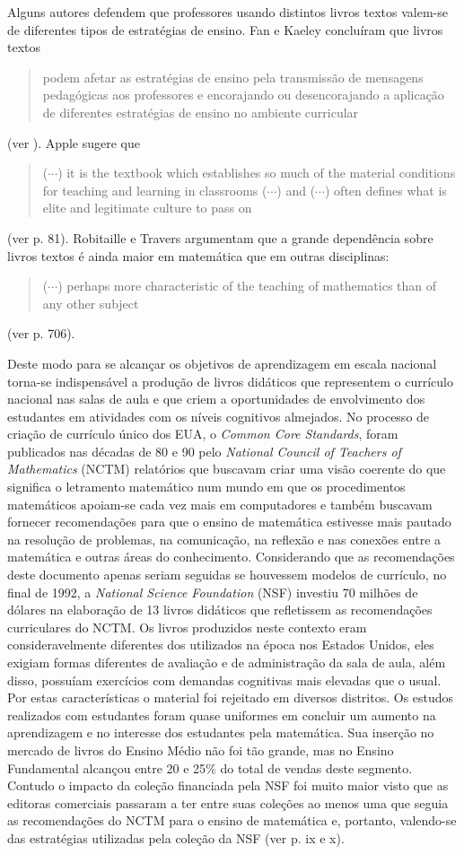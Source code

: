 \documentclass[10 pt]{article}
\begin{document}
Alguns autores defendem que professores usando distintos livros textos valem-se de diferentes tipos de estratégias de ensino. 
Fan e Kaeley concluíram que livros textos \blockquote{podem afetar as estratégias de ensino pela transmissão de mensagens pedagógicas aos professores e encorajando ou desencorajando a aplicação de diferentes estratégias de ensino no ambiente curricular} (ver \cite{fan2000influence}). Apple sugere que {\it 
\blockquote{($\cdots$) it is the textbook which establishes so much of the material conditions for teaching and learning in classrooms ($\cdots$) and ($\cdots$) often defines what is elite and legitimate culture to pass on}} (ver \cite{apple2013teachers} p. 81). Robitaille e Travers argumentam que a grande dependência sobre livros textos é ainda maior em matemática que em outras disciplinas:
{\it \blockquote{($\cdots$) perhaps more characteristic of the teaching of mathematics than of any other subject}} (ver \cite{robitaille1992international} p. 706).

Deste modo para se alcançar os objetivos de aprendizagem em escala nacional torna-se indispensável a produção de livros didáticos que representem o currículo nacional nas salas de aula e que criem a oportunidades de envolvimento dos estudantes em atividades com os níveis cognitivos almejados. 
No processo de criação de currículo único dos EUA, o {\it Common Core Standards}, foram publicados nas décadas de 80 e 90 pelo {\it National Council of Teachers of Mathematics} (NCTM) relatórios que buscavam criar uma visão coerente do que significa o letramento matemático num mundo em que os procedimentos matemáticos apoiam-se cada vez mais em computadores e também buscavam fornecer recomendações para que o ensino de matemática estivesse mais pautado na resolução de problemas, na comunicação, na reflexão e nas conexões entre a matemática e outras áreas do conhecimento.
Considerando que as recomendações deste documento apenas seriam seguidas se houvessem modelos de currículo,  no final de 1992, a {\it National Science Foundation} (NSF) investiu 70 milhões de dólares na elaboração de 13 livros didáticos que refletissem as recomendações curriculares do NCTM. 
Os livros produzidos neste contexto eram consideravelmente diferentes dos utilizados na época nos Estados Unidos, eles exigiam formas diferentes de avaliação e de administração da sala de aula, além disso, possuíam exercícios com demandas cognitivas mais elevadas que o usual. 
Por estas características o material foi rejeitado em diversos distritos. 
Os estudos realizados com estudantes foram quase uniformes em concluir um aumento na aprendizagem e no interesse dos estudantes pela matemática. 
Sua inserção no mercado de livros do Ensino Médio não foi tão grande, mas no Ensino Fundamental alcançou entre 20 e 25$\%$ do total de vendas deste segmento. 
Contudo o impacto da coleção financiada pela NSF foi muito maior visto que as editoras comerciais passaram a ter entre suas coleções ao menos uma que seguia as recomendações do NCTM para o ensino de matemática e, portanto, valendo-se das estratégias utilizadas pela coleção da NSF (ver \cite{hirsch2007perspectives} p. ix e x).
\end{document}
